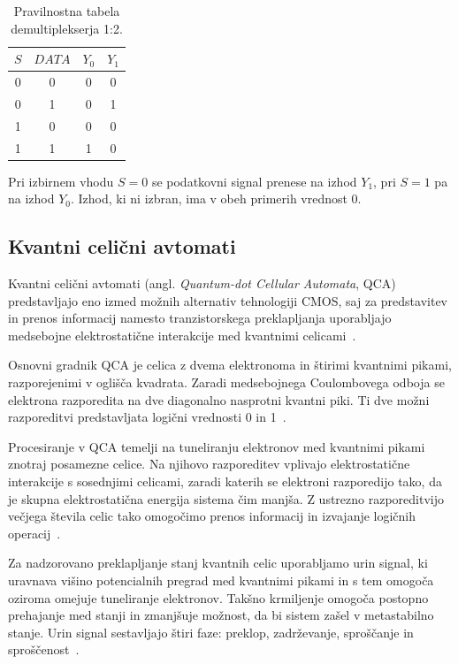 \documentclass[graybox, envcountchap]{svmult}
\begin{document}
\begin{table}[htbp]
    \centering
    \caption{Pravilnostna tabela demultiplekserja 1:2.}
    \label{g21:tab:demux}
    \begin{tabular*}{0.25\linewidth}{@{\extracolsep{\fill}}cccc}
        \toprule
        $S$ & $DATA$ & $Y_0$ & $Y_1$ \\
        \midrule
        0 & 0 & 0 & 0 \\
        0 & 1 & 0 & 1 \\
        1 & 0 & 0 & 0 \\
        1 & 1 & 1 & 0 \\
        \bottomrule
    \end{tabular*}
\end{table}

Pri izbirnem vhodu $S=0$ se podatkovni signal prenese na izhod $Y_1$, pri $S=1$ pa na izhod $Y_0$. Izhod, ki ni izbran, ima v obeh primerih vrednost 0.


\subsection{Kvantni celični avtomati}
\label{g21:sec:qca}

Kvantni celični avtomati (angl. \emph{Quantum-dot Cellular Automata}, QCA) predstavljajo eno izmed možnih alternativ tehnologiji CMOS, saj za predstavitev in prenos informacij namesto tranzistorskega preklapljanja uporabljajo medsebojne elektrostatične interakcije med kvantnimi celicami~\cite{janez2012}.

Osnovni gradnik QCA je celica z dvema elektronoma in štirimi kvantnimi pikami, razporejenimi v oglišča kvadrata. Zaradi medsebojnega Coulombovega odboja se elektrona razporedita na dve diagonalno nasprotni kvantni piki. Ti dve možni razporeditvi predstavljata logični vrednosti 0 in 1~\cite{janez2012}.

Procesiranje v QCA temelji na tuneliranju elektronov med kvantnimi pikami znotraj posamezne celice. Na njihovo razporeditev vplivajo elektrostatične interakcije s sosednjimi celicami, zaradi katerih se elektroni razporedijo tako, da je skupna elektrostatična energija sistema čim manjša. Z ustrezno razporeditvijo večjega števila celic tako omogočimo prenos informacij in izvajanje logičnih operacij~\cite{janez2012}.

Za nadzorovano preklapljanje stanj kvantnih celic uporabljamo urin signal, ki uravnava višino potencialnih pregrad med kvantnimi pikami in s tem omogoča oziroma omejuje tuneliranje elektronov. Takšno krmiljenje omogoča postopno prehajanje med stanji in zmanjšuje možnost, da bi sistem zašel v metastabilno stanje. Urin signal sestavljajo štiri faze: preklop, zadrževanje, sproščanje in sproščenost~\cite{janez2012}.
\end{document}
